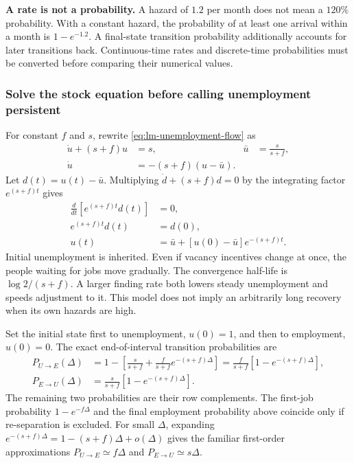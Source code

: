 \begin{blueblock}
\textbf{A rate is not a probability.}
A hazard of $1.2$ per month does not mean a $120\%$ probability. With a constant
hazard, the probability of at least one arrival within a month is
$1-e^{-1.2}$. A final-state transition probability additionally accounts for
later transitions back. Continuous-time rates and discrete-time probabilities
must be converted before comparing their numerical values.
\end{blueblock}

\subsubsection{Solve the stock equation before calling unemployment persistent}

For constant $f$ and $s$, rewrite \eqref{eq:lm-unemployment-flow} as
\begin{align}
 \dot u+(s+f)u&=s, & \bar u&=\frac{s}{s+f},\\
 \dot u&=-(s+f)(u-\bar u).
\end{align}
Let $d(t)=u(t)-\bar u$. Multiplying $\dot d+(s+f)d=0$ by the integrating factor
$e^{(s+f)t}$ gives
\begin{align}
 \frac{d}{dt}[e^{(s+f)t}d(t)]&=0,\\
 e^{(s+f)t}d(t)&=d(0),\\
 u(t)&=\bar u+[u(0)-\bar u]e^{-(s+f)t}.
 \label{eq:lm-stock-solution}
\end{align}
Initial unemployment is inherited. Even if vacancy incentives change at once,
the people waiting for jobs move gradually. The convergence half-life is
$\log2/(s+f)$. A larger finding rate both lowers steady unemployment and speeds
adjustment to it. This model does not imply an arbitrarily long recovery when
its own hazards are high.

Set the initial state first to unemployment, $u(0)=1$, and then to employment,
$u(0)=0$. The exact end-of-interval transition probabilities are
\begin{align}
 P_{U\to E}(\Delta)
 &=1-\left[\frac{s}{s+f}+\frac f{s+f}e^{-(s+f)\Delta}\right]
   =\frac f{s+f}[1-e^{-(s+f)\Delta}],\\
 P_{E\to U}(\Delta)
 &=\frac{s}{s+f}[1-e^{-(s+f)\Delta}].
\end{align}
The remaining two probabilities are their row complements. The first-job
probability $1-e^{-f\Delta}$ and the final employment probability above
coincide only if re-separation is excluded. For small $\Delta$, expanding
$e^{-(s+f)\Delta}=1-(s+f)\Delta+o(\Delta)$ gives the familiar first-order
approximations $P_{U\to E}\simeq f\Delta$ and $P_{E\to U}\simeq s\Delta$.

